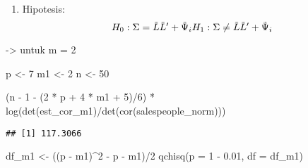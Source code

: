 \documentclass[
]{article}
\newenvironment{Shaded}{\begin{snugshade}}{\end{snugshade}}
\newcommand{\AttributeTok}[1]{\textcolor[rgb]{0.77,0.63,0.00}{#1}}
\newcommand{\DecValTok}[1]{\textcolor[rgb]{0.00,0.00,0.81}{#1}}
\newcommand{\FloatTok}[1]{\textcolor[rgb]{0.00,0.00,0.81}{#1}}
\newcommand{\FunctionTok}[1]{\textcolor[rgb]{0.00,0.00,0.00}{#1}}
\newcommand{\NormalTok}[1]{#1}
\newcommand{\OtherTok}[1]{\textcolor[rgb]{0.56,0.35,0.01}{#1}}
\newcommand{\SpecialCharTok}[1]{\textcolor[rgb]{0.00,0.00,0.00}{#1}}
\providecommand{\tightlist}{%
  \setlength{\itemsep}{0pt}\setlength{\parskip}{0pt}}
\begin{document}
\begin{enumerate}
\def\labelenumi{\alph{enumi}.}
\setcounter{enumi}{3}
\tightlist
\item
  Hipotesis: \[H_{0}: \Sigma = \tilde{L}\tilde{L}' + \tilde{\Psi}_{i} \\
  H_{1}: \Sigma \not = \tilde{L}\tilde{L}' + \tilde{\Psi}_{i}\]
\end{enumerate}

-\textgreater{} untuk m = 2

\begin{Shaded}
\end{Shaded}

\begin{Shaded}
\begin{Highlighting}[]
\NormalTok{p }\OtherTok{\textless{}{-}} \DecValTok{7}
\NormalTok{m1 }\OtherTok{\textless{}{-}} \DecValTok{2}
\NormalTok{n }\OtherTok{\textless{}{-}} \DecValTok{50}

\NormalTok{(n }\SpecialCharTok{{-}} \DecValTok{1} \SpecialCharTok{{-}}\NormalTok{ (}\DecValTok{2} \SpecialCharTok{*}\NormalTok{ p }\SpecialCharTok{+} \DecValTok{4} \SpecialCharTok{*}\NormalTok{ m1 }\SpecialCharTok{+} \DecValTok{5}\NormalTok{)}\SpecialCharTok{/}\DecValTok{6}\NormalTok{) }\SpecialCharTok{*} \FunctionTok{log}\NormalTok{(}\FunctionTok{det}\NormalTok{(est\_cor\_m1)}\SpecialCharTok{/}\FunctionTok{det}\NormalTok{(}\FunctionTok{cor}\NormalTok{(salespeople\_norm)))}
\end{Highlighting}
\end{Shaded}

\begin{verbatim}
## [1] 117.3066
\end{verbatim}

\begin{Shaded}
\begin{Highlighting}[]
\NormalTok{df\_m1 }\OtherTok{\textless{}{-}}\NormalTok{ ((p }\SpecialCharTok{{-}}\NormalTok{ m1)}\SpecialCharTok{\^{}}\DecValTok{2} \SpecialCharTok{{-}}\NormalTok{ p }\SpecialCharTok{{-}}\NormalTok{ m1)}\SpecialCharTok{/}\DecValTok{2}
\FunctionTok{qchisq}\NormalTok{(}\AttributeTok{p =} \DecValTok{1} \SpecialCharTok{{-}} \FloatTok{0.01}\NormalTok{, }\AttributeTok{df =}\NormalTok{ df\_m1)}
\end{Highlighting}
\end{Shaded}
\end{document}
